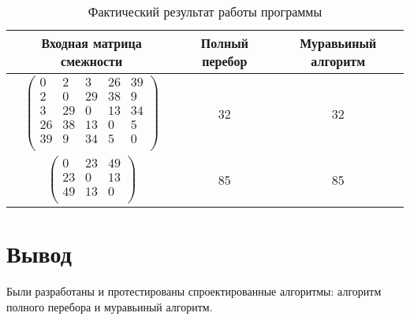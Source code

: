 \begin{table}[h!]
	\begin{center}
		\caption{\label{tabular:func_test_res}Фактический результат работы программы}
		\begin{tabular}{|c|c|c|}
			\hline
			Входная матрица смежности & Полный перебор & Муравьиный алгоритм \\ 
			\hline
			$\begin{pmatrix}
				0 &    2 &    3 &   26 &   39 \\ 
				2 &    0 &   29 &   38 &    9 \\ 
				3 &   29 &    0 &   13 &   34 \\ 
				26 &   38 &   13 &    0 &    5 \\ 
				39 &    9 &   34 &    5 &    0 \\ 
			\end{pmatrix}$ & 32 & 32	 \\\hline
			$\begin{pmatrix}
				0 &   23 &   49 \\ 
				23 &    0 &   13 \\ 
				49 &   13 &    0 \\ 
			\end{pmatrix}$ & 85 & 85	\\\hline
		\end{tabular}
	\end{center}
\end{table}


\captionsetup{singlelinecheck = false, justification=centering}

\section{Вывод}

Были разработаны и протестированы спроектированные алгоритмы: алгоритм полного перебора и муравьиный алгоритм.

